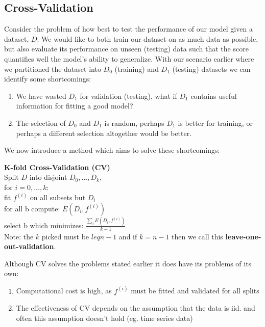 \subsection{Cross-Validation}
Consider the problem of how best to test the performance of our model given a dataset, $D$. We would like to both train our dataset on as much data as possible, but also evaluate its performance on unseen (testing) data such that the score quantifies well the model's ability to generalize. With our scenario earlier where we partitioned the dataset into $D_{0}$ (training) and $D_{1}$ (testing) datasets we can identify some shortcomings:
\begin{enumerate}
    \item We have wasted $D_{1}$ for validation (testing), what if $D_{1}$ contains useful information for fitting a good model?
    \item The selection of $D_{0}$ and $D_{1}$ is random, perhaps $D_{1}$ is better for training, or perhaps a different selection altogether would be better.
\end{enumerate}
We now introduce a method which aims to solve these shortcomings:
\begin{definition}
    \textbf{K-fold Cross-Validation (CV)} \\
    Split $D$ into disjoint $D_{0},..., D_{k}$, \\
    for $i=0,...,k$: \\
    \indent fit $f^{(i)}$ on all subsets but $D_{i}$ \\
    \indent for all b compute: $E(D_{i}, f^{(i)})$ \\
    select b which minimizes: $\frac{\sum_{i} E(D_{i},f^{(i)})}{k+1}$ \\
    Note: the $k$ picked must be $leq n-1$ and if $k=n-1$ then we call this \textbf{leave-one-out-validation}. 
\end{definition}
Although CV solves the problems stated earlier it does have its problems of its own:
\begin{enumerate}
    \item Computational cost is high, as $f^{(i)}$ must be fitted and validated for all splits
    \item The effectiveness of CV depends on the assumption that the data is iid. and often this assumption doesn't hold (eg. time series data)
\end{enumerate}

